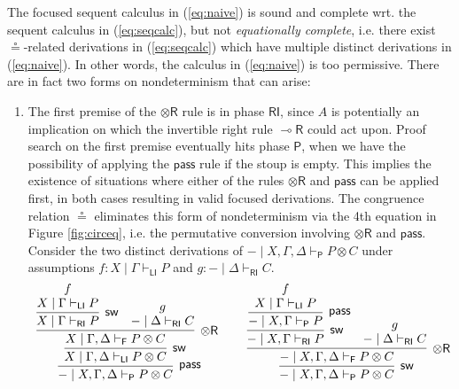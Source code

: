 \documentclass[submission,copyright,creativecommons]{eptcs}
\theoremstyle{definition}
\newcommand{\tr}{\otimes \mathsf{R}}
\newcommand{\lright}{{\multimap}\mathsf{R}}
\newcommand{\pass}{\mathsf{pass}}
\newcommand{\ot}{\otimes}
\newcommand{\RI}{\mathsf{RI}}
\newcommand{\LI}{\mathsf{LI}}
\newcommand{\Pass}{\mathsf{P}}
\newcommand{\F}{\mathsf{F}}
\newcommand{\proofbox}[1]{\begin{tabular}{l} #1 \end{tabular}}
\begin{document}
The focused sequent calculus in (\ref{eq:naive}) is sound and complete wrt. the sequent calculus in (\ref{eq:seqcalc}), but not \emph{equationally complete}, i.e. there exist $\circeq$-related derivations in (\ref{eq:seqcalc}) which have multiple distinct derivations in (\ref{eq:naive}). In other words, the calculus in (\ref{eq:naive}) is too permissive. There are in fact two forms on nondeterminism that can arise:
\begin{enumerate}
\item The first premise of the $\tr$ rule is in phase $\RI$, since $A$ is potentially an implication on which the invertible right rule $\lright$ could act upon. Proof search on the first premise eventually hits phase $\Pass$, when we have the possibility of applying the $\pass$ rule if the stoup is empty. This implies the existence of situations where either of the rules $\tr$ and $\pass$ can be applied first, in both cases resulting in valid focused derivations. The congruence relation $\circeq$ eliminates this form of nondeterminism via the 4th equation in Figure \ref{fig:circeq}, i.e. the permutative conversion involving $\tr$ and $\pass$.
  Consider the two distinct derivations of $- \mid X , \Gamma , \Delta \vdash_{\Pass} P \ot C$ under assumptions $f : X \mid \Gamma \vdash_{\LI} P$ and $g : - \mid \Delta \vdash_{\RI} C$.
  \begin{equation}\label{eq:passtr}
    \proofbox{
      \infer[\pass]{- \mid X , \Gamma , \Delta \vdash_{\Pass} P \ot C}{
        \infer[\mathsf{sw}]{X \mid \Gamma , \Delta \vdash_{\LI} P \ot C}{
          \infer[\tr]{X \mid \Gamma , \Delta \vdash_{\F} P \ot C}{
            \infer[\mathsf{sw}]{X \mid \Gamma \vdash_{\RI} P}{
              \deduce{X \mid \Gamma \vdash_{\LI} P}{f}
            }
            &
            \deduce{- \mid \Delta \vdash_{\RI} C}{g}
          }
        }
      }
    \qquad
    \infer[\mathsf{sw}]{- \mid X , \Gamma , \Delta \vdash_{\Pass} P \ot C}{
      \infer[\tr]{- \mid X , \Gamma , \Delta \vdash_{\F} P \ot C}{
        \infer[\mathsf{sw}]{- \mid X , \Gamma \vdash_{\RI} P}{
          \infer[\pass]{- \mid X , \Gamma \vdash_{\Pass} P}{
            \deduce{X \mid \Gamma \vdash_{\LI} P}{f}
          }
        }
        &
        \deduce{- \mid \Delta \vdash_{\RI} C}{g}
}}}
\end{equation}
\end{enumerate}
\end{document}

